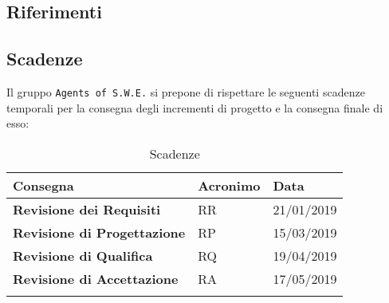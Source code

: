 \subsection{Riferimenti}

\newpage

\subsection{Scadenze}
Il gruppo \texttt{Agents of S.W.E.} si prepone di rispettare le seguenti scadenze temporali per la consegna degli incrementi di progetto e la consegna finale di esso:


\begin{longtable}{|C{.40\textwidth}|C{.15\textwidth}|C{.20\textwidth}|}
\hline
\textbf{Consegna} & \textbf{Acronimo} & \textbf{Data}\\
\hline \hline
\endfirsthead

\textbf{Revisione dei Requisiti} & RR & 21/01/2019 \\
\hline
\textbf{Revisione di Progettazione} & RP & 15/03/2019 \\
\hline
\textbf{Revisione di Qualifica} & RQ & 19/04/2019 \\
\hline
\textbf{Revisione di Accettazione} & RA & 17/05/2019 \\
\hline
\caption{Scadenze}
\label{Tabella Scadenze}
\end{longtable}